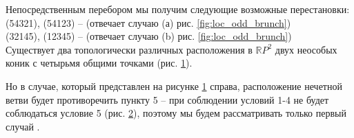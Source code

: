 \documentclass[11pt]{article}
\begin{document}
Непосредственным перебором мы получим следующие возможные перестановки:\\
(54321), (54123) – (отвечает случаю (а) рис. \ref{fig:loc_odd_brunch})\\ 
(32145), (12345) – (отвечает случаю (b) рис. \ref{fig:loc_odd_brunch})\\

Существует два топологически различных расположения в $\mathbb RP^2$ двух неособых коник с четырьмя общими точками (рис. \ref{fig:intersection_of_ovals}).

\begin{figure}[H]
\caption{}
\label{fig:intersection_of_ovals}
\end{figure}

Но в случае, который представлен на рисунке \ref{fig:intersection_of_ovals} справа, расположение нечетной ветви будет противоречить пункту 5 -- при соблюдении условий 1-4 не будет соблюдаться условие 5 (рис. \ref{fig:prohibit_second_inters_ovals}),  поэтому мы будем рассматривать только первый случай .

\begin{figure}[H]
\caption{}
\label{fig:prohibit_second_inters_ovals}
\end{figure}
\end{document}
